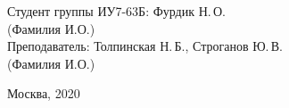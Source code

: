 \begin{titlepage}
	\begin{center}
		\newlength{\ML}
		\hfill Студент группы ИУ7-63Б:\hspace{0.2cm} Фурдик Н.\,О.\\
		\hfill\hspace{1.7cm} (Фамилия И.О.)\\
		\hfill Преподаватель:\hspace{0.2cm} Толпинская Н.\,Б., Строганов Ю.\,В.\\
		\hfill\hspace{1.7cm} (Фамилия И.О.)\\
		
	\end{center}
	
	\vspace{0pt plus4fill} %
	{\centering Москва, 2020\par}
\end{titlepage}